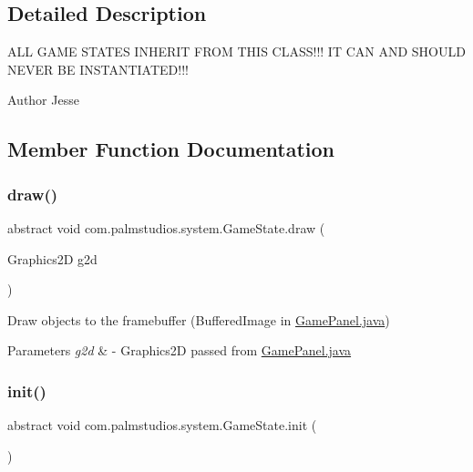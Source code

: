 \subsection{Detailed Description}
A\+LL G\+A\+ME S\+T\+A\+T\+ES I\+N\+H\+E\+R\+IT F\+R\+OM T\+H\+IS C\+L\+A\+S\+S!!! IT C\+AN A\+ND S\+H\+O\+U\+LD N\+E\+V\+ER BE I\+N\+S\+T\+A\+N\+T\+I\+A\+T\+E\+D!!! \begin{DoxyAuthor}{Author}
Jesse 
\end{DoxyAuthor}


\subsection{Member Function Documentation}
\mbox{\label{classcom_1_1palmstudios_1_1system_1_1_game_state_ae1b37576ee7080b342860a9756969e29}} 
\subsubsection{\texorpdfstring{draw()}{draw()}}
{\footnotesize\ttfamily abstract void com.\+palmstudios.\+system.\+Game\+State.\+draw (\begin{DoxyParamCaption}\item[{Graphics2D}]{g2d }\end{DoxyParamCaption})\hspace{0.3cm}{\ttfamily [abstract]}}

Draw objects to the framebuffer (Buffered\+Image in \hyperlink{_game_panel_8java}{Game\+Panel.\+java}) 
\begin{DoxyParams}{Parameters}
{\em g2d} & -\/ Graphics2D passed from \hyperlink{_game_panel_8java}{Game\+Panel.\+java} \\
\hline
\end{DoxyParams}
\mbox{\label{classcom_1_1palmstudios_1_1system_1_1_game_state_aefc8099403a9b7a8c133e4311becc24b}} 
\subsubsection{\texorpdfstring{init()}{init()}}
{\footnotesize\ttfamily abstract void com.\+palmstudios.\+system.\+Game\+State.\+init (\begin{DoxyParamCaption}{ }\end{DoxyParamCaption})\hspace{0.3cm}{\ttfamily [abstract]}}

